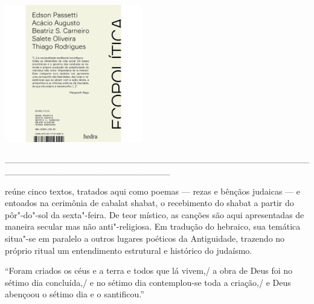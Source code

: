 \pagestyle{ayllon}
\label{ayllon}

\hspace{.5cm}

\begin{center}
\hspace*{-2cm}
\hspace{1cm}\includegraphics[width=60mm]{eco.jpeg}
\end{center}

\hspace*{-2cm}\_\_\_\_\_\_\_\_\_\_\_\_\_\_\_\_\_\_\_\_\_\_\_\_\_\_\_\_\_\_\_\_\_\_\_\_\_\_\_\_\_\_\_\_\_\_\_\_\_\_\_\_\_\_\_\_\_\_\_\_\_\_\_\_\_\_\_\_\_\_\_\_\_\_

\medskip

 reúne cinco textos, tratados aqui como poemas --- rezas e bênçãos judaicas --- e entoados na cerimônia de cabalat shabat, o recebimento do shabat a partir do pôr"-do"-sol da sexta"-feira. De teor místico, as canções são aqui apresentadas de maneira secular mas não anti"-religiosa. Em tradução do hebraico, sua temática situa"-se em paralelo a outros lugares poéticos da Antiguidade, trazendo no próprio ritual um entendimento estrutural e histórico do judaísmo. %

\hspace{.5cm}

\hspace*{-.4cm}\begin{minipage}[c]{0.45\linewidth}
\small{
{}}
\end{minipage}
\begin{minipage}[c]{0.50\linewidth}
\small{``Foram criados os céus e a terra e todos que lá vivem,/ a obra de Deus foi no sétimo dia concluída,/ e no sétimo dia contemplou-se toda a criação,/ e Deus abençoou o sétimo dia e o santificou.''}%
\end{minipage}

